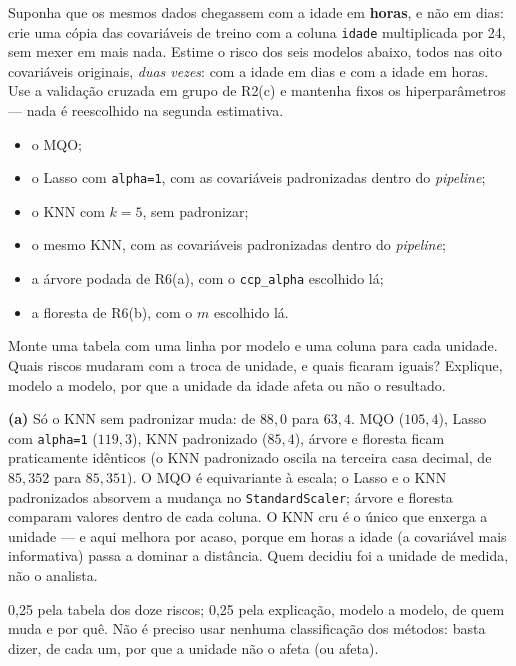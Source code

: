 \documentclass[11pt,a4paper]{article}
\newcommand{\cod}[1]{\texttt{#1}}
\begin{document}
\begin{itens}
  \item Suponha que os mesmos dados chegassem com a idade em \textbf{horas}, e não em
        dias: crie uma cópia das covariáveis de treino com a coluna \cod{idade}
        multiplicada por 24, sem mexer em mais nada. Estime o risco dos seis modelos
        abaixo, todos nas oito covariáveis originais, \emph{duas vezes}: com a idade em
        dias e com a idade em horas. Use a validação cruzada em grupo de R2(c) e
        mantenha fixos os hiperparâmetros --- nada é reescolhido na segunda estimativa.
        \begin{itemize}[nosep]
          \item o MQO;
          \item o Lasso com \cod{alpha=1}, com as covariáveis padronizadas dentro do
                \emph{pipeline};
          \item o KNN com $k=5$, sem padronizar;
          \item o mesmo KNN, com as covariáveis padronizadas dentro do \emph{pipeline};
          \item a árvore podada de R6(a), com o \cod{ccp\_alpha} escolhido lá;
          \item a floresta de R6(b), com o $m$ escolhido lá.
        \end{itemize}
        Monte uma tabela com uma linha por modelo e uma coluna para cada unidade. Quais
        riscos mudaram com a troca de unidade, e quais ficaram iguais? Explique, modelo a
        modelo, por que a unidade da idade afeta ou não o resultado.
\end{itens}

\begin{solucao}
\textbf{(a)} Só o KNN sem padronizar muda: de $88{,}0$ para $63{,}4$. MQO
($105{,}4$), Lasso com \cod{alpha=1} ($119{,}3$), KNN padronizado ($85{,}4$), árvore e floresta
ficam praticamente idênticos (o KNN padronizado oscila na terceira casa decimal, de
$85{,}352$ para $85{,}351$). O MQO é equivariante à escala; o Lasso e o KNN
padronizados absorvem a mudança no \cod{StandardScaler}; árvore e floresta comparam
valores dentro de cada coluna. O KNN cru é o único que enxerga a unidade --- e aqui
melhora por acaso, porque em horas a idade (a covariável mais informativa) passa a
dominar a distância. Quem decidiu foi a unidade de medida, não o analista.
\end{solucao}

\begin{criterio}
0,25 pela tabela dos doze riscos; 0,25 pela explicação, modelo a modelo, de quem muda e
por quê. Não é preciso usar nenhuma classificação dos métodos: basta dizer, de cada um,
por que a unidade não o afeta (ou afeta).
\end{criterio}
\end{document}
